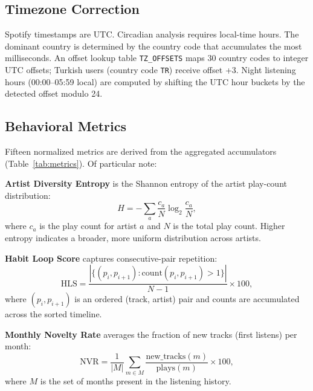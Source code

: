\documentclass[conference]{IEEEtran}
\begin{document}
\subsection{Timezone Correction}

Spotify timestamps are UTC. Circadian analysis requires local-time hours.
The dominant country is determined by the country code that accumulates the
most milliseconds. An offset lookup table \texttt{TZ\_OFFSETS} maps 30
country codes to integer UTC offsets; Turkish users (country code
\texttt{TR}) receive offset +3. Night listening hours (00:00–05:59 local)
are computed by shifting the UTC hour buckets by the detected offset modulo
24.

\subsection{Behavioral Metrics}

Fifteen normalized metrics are derived from the aggregated accumulators
(Table~\ref{tab:metrics}). Of particular note:

\textbf{Artist Diversity Entropy} is the Shannon entropy of the artist
play-count distribution:
\begin{equation}
  H = -\sum_{a} \frac{c_a}{N} \log_2 \frac{c_a}{N},
\end{equation}
where $c_a$ is the play count for artist $a$ and $N$ is the total play count.
Higher entropy indicates a broader, more uniform distribution across artists.

\textbf{Habit Loop Score} captures consecutive-pair repetition:
\begin{equation}
  \text{HLS} = \frac{|\{(p_i, p_{i+1}) : \mathrm{count}(p_i, p_{i+1}) > 1\}|}{N - 1} \times 100,
\end{equation}
where $(p_i, p_{i+1})$ is an ordered (track, artist) pair and counts are
accumulated across the sorted timeline.

\textbf{Monthly Novelty Rate} averages the fraction of new tracks (first
listens) per month:
\begin{equation}
  \text{NVR} = \frac{1}{|M|} \sum_{m \in M} \frac{\text{new\_tracks}(m)}{\text{plays}(m)} \times 100,
\end{equation}
where $M$ is the set of months present in the listening history.
\end{document}
